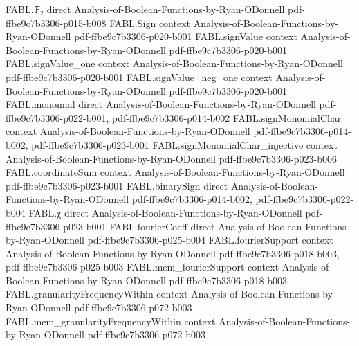 \begin{theorem}
\label{FABL.size_mintermDNF_parityFunction_univ}
\leanok
{}
\proofstep
  {FABL.𝔽₂}
  {direct}
  {Analysis-of-Boolean-Functions-by-Ryan-ODonnell}
  {pdf-ffbe9c7b3306-p015-b008}
\proofstep
  {FABL.Sign}
  {context}
  {Analysis-of-Boolean-Functions-by-Ryan-ODonnell}
  {pdf-ffbe9c7b3306-p020-b001}
\proofstep
  {FABL.signValue}
  {context}
  {Analysis-of-Boolean-Functions-by-Ryan-ODonnell}
  {pdf-ffbe9c7b3306-p020-b001}
\proofstep
  {FABL.signValue_one}
  {context}
  {Analysis-of-Boolean-Functions-by-Ryan-ODonnell}
  {pdf-ffbe9c7b3306-p020-b001}
\proofstep
  {FABL.signValue_neg_one}
  {context}
  {Analysis-of-Boolean-Functions-by-Ryan-ODonnell}
  {pdf-ffbe9c7b3306-p020-b001}
\proofstep
  {FABL.monomial}
  {direct}
  {Analysis-of-Boolean-Functions-by-Ryan-ODonnell}
  {pdf-ffbe9c7b3306-p022-b001,
    pdf-ffbe9c7b3306-p014-b002}
\proofstep
  {FABL.signMonomialChar}
  {context}
  {Analysis-of-Boolean-Functions-by-Ryan-ODonnell}
  {pdf-ffbe9c7b3306-p014-b002,
    pdf-ffbe9c7b3306-p023-b001}
\proofstep
  {FABL.signMonomialChar_injective}
  {context}
  {Analysis-of-Boolean-Functions-by-Ryan-ODonnell}
  {pdf-ffbe9c7b3306-p023-b006}
\proofstep
  {FABL.coordinateSum}
  {context}
  {Analysis-of-Boolean-Functions-by-Ryan-ODonnell}
  {pdf-ffbe9c7b3306-p023-b001}
\proofstep
  {FABL.binarySign}
  {direct}
  {Analysis-of-Boolean-Functions-by-Ryan-ODonnell}
  {pdf-ffbe9c7b3306-p014-b002,
    pdf-ffbe9c7b3306-p022-b004}
\proofstep
  {FABL.χ}
  {direct}
  {Analysis-of-Boolean-Functions-by-Ryan-ODonnell}
  {pdf-ffbe9c7b3306-p023-b001}
\proofstep
  {FABL.fourierCoeff}
  {direct}
  {Analysis-of-Boolean-Functions-by-Ryan-ODonnell}
  {pdf-ffbe9c7b3306-p025-b004}
\proofstep
  {FABL.fourierSupport}
  {context}
  {Analysis-of-Boolean-Functions-by-Ryan-ODonnell}
  {pdf-ffbe9c7b3306-p018-b003,
    pdf-ffbe9c7b3306-p025-b003}
\proofstep
  {FABL.mem_fourierSupport}
  {context}
  {Analysis-of-Boolean-Functions-by-Ryan-ODonnell}
  {pdf-ffbe9c7b3306-p018-b003}
\proofstep
  {FABL.granularityFrequencyWithin}
  {context}
  {Analysis-of-Boolean-Functions-by-Ryan-ODonnell}
  {pdf-ffbe9c7b3306-p072-b003}
\proofstep
  {FABL.mem_granularityFrequencyWithin}
  {context}
  {Analysis-of-Boolean-Functions-by-Ryan-ODonnell}
  {pdf-ffbe9c7b3306-p072-b003}

\end{theorem}
